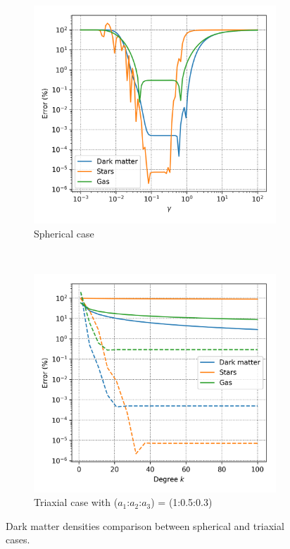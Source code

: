 		\begin{figure}[h]
			\centering
			\begin{subfigure}[b]{0.49\textwidth}
				\includegraphics[width = \textwidth]{"../Files/Week 8/gamma_error"}
				\caption{Spherical case}
			\end{subfigure}
			~ 
			\begin{subfigure}[b]{0.49\textwidth}
				\includegraphics[width=\textwidth]{"../Files/Week 8/scheme_error"}
				\caption{Triaxial case with ($a_1$:$a_2$:$a_3$) = (1:0.5:0.3)}
			\end{subfigure}
			\caption{Dark matter densities comparison between spherical and triaxial cases.}
		\end{figure}
		